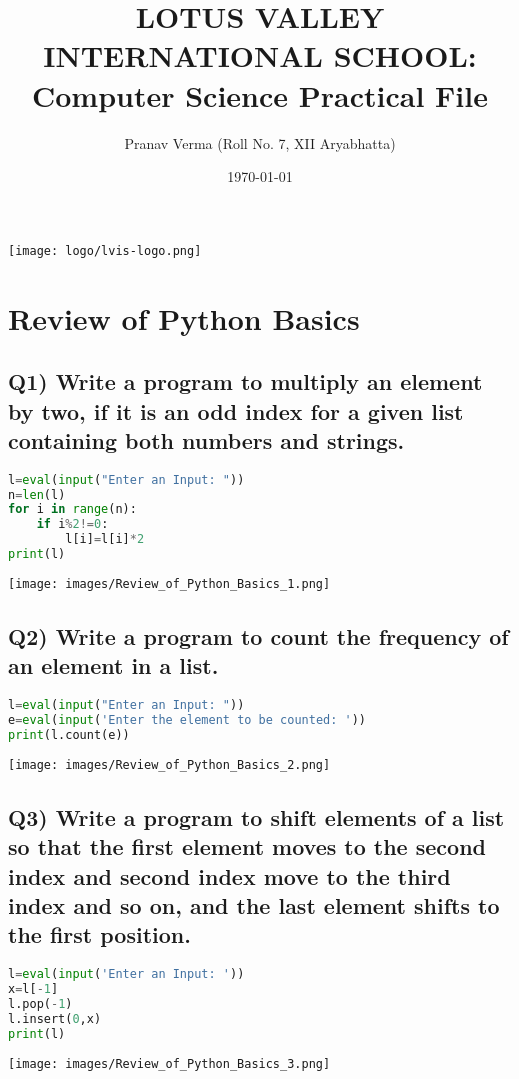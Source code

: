 \documentclass{article}
\title{LOTUS VALLEY INTERNATIONAL SCHOOL: Computer Science Practical File}
\author{Pranav Verma (Roll No. 7, XII Aryabhatta)}
\date{\today}
\begin{document}
\maketitle

\begin{center}
\texttt{[image: logo/lvis-logo.png]}
\end{center}

\vspace*{\fill}

\tableofcontents

\section{Review of Python Basics}

\subsection*{Q1) Write a program to multiply an element by two, if it is an odd index for a given list containing both numbers and strings.}
\begin{lstlisting}[language=Python]
l=eval(input("Enter an Input: "))
n=len(l)
for i in range(n):
    if i%2!=0:
        l[i]=l[i]*2
print(l)
\end{lstlisting}
\texttt{[image: images/Review\_of\_Python\_Basics\_1.png]}

\subsection*{Q2) Write a program to count the frequency of an element in a list.}
\begin{lstlisting}[language=Python]
l=eval(input("Enter an Input: "))
e=eval(input('Enter the element to be counted: '))
print(l.count(e))
\end{lstlisting}
\texttt{[image: images/Review\_of\_Python\_Basics\_2.png]}

\subsection*{Q3) Write a program to shift elements of a list so that the first element moves to the second index and second index move to the third index and so on, and the last element shifts to the first position.}
\begin{lstlisting}[language=Python]
l=eval(input('Enter an Input: '))
x=l[-1]
l.pop(-1)
l.insert(0,x)
print(l)
\end{lstlisting}
\texttt{[image: images/Review\_of\_Python\_Basics\_3.png]}
\end{document}
